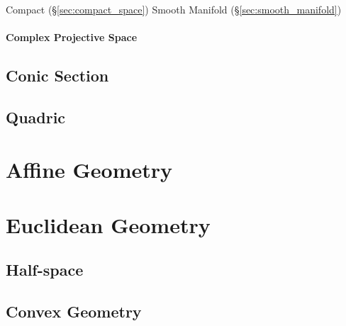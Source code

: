 Compact (\S\ref{sec:compact_space}) Smooth Manifold
(\S\ref{sec:smooth_manifold})



\paragraph{Complex Projective Space}\label{sec:complex_projective_space}
\hfill



\subsection{Conic Section}\label{sec:conic_section}

\subsection{Quadric}\label{sec:quadric}



\section{Affine Geometry}\label{sec:affine_geometry}

\section{Euclidean Geometry}\label{sec:euclidean_geometry}

\subsection{Half-space}\label{sec:half_space}

\subsection{Convex Geometry}\label{sec:convex_geometry}

